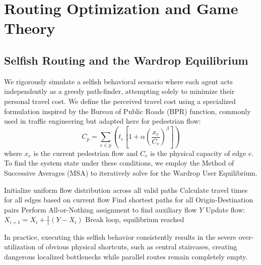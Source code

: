 \documentclass[conference]{IEEEtran}
\begin{document}
\section{Routing Optimization and Game Theory}

\subsection{Selfish Routing and the Wardrop Equilibrium}
We rigorously simulate a selfish behavioral scenario where each agent acts independently as a greedy path-finder, attempting solely to minimize their personal travel cost. We define the perceived travel cost using a specialized formulation inspired by the Bureau of Public Roads (BPR) function, commonly used in traffic engineering but adapted here for pedestrian flow:
\begin{equation}
C_p = \sum_{e \in p} \left( t_e \left[ 1 + \alpha \left( \frac{x_e}{C_e} \right)^\beta \right] \right)
\end{equation}
where $x_e$ is the current pedestrian flow and $C_e$ is the physical capacity of edge $e$. To find the system state under these conditions, we employ the Method of Successive Averages (MSA) to iteratively solve for the Wardrop User Equilibrium. 

\begin{algorithm}
\caption{Method of Successive Averages for User Equilibrium}
\begin{algorithmic}[1]
\STATE Initialize uniform flow distribution across all valid paths
    \STATE Calculate travel times for all edges based on current flow
    \STATE Find shortest paths for all Origin-Destination pairs
    \STATE Perform All-or-Nothing assignment to find auxiliary flow $Y$
    \STATE Update flow: $X_{i+1} = X_i + \frac{1}{i}(Y - X_i)$
        \STATE Break loop, equilibrium reached
    \ENDIF
\ENDFOR
\end{algorithmic}
\end{algorithm}

In practice, executing this selfish behavior consistently results in the severe over-utilization of obvious physical shortcuts, such as central staircases, creating dangerous localized bottlenecks while parallel routes remain completely empty.
\end{document}
